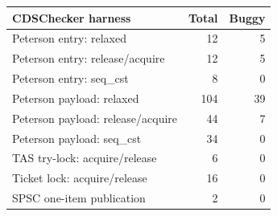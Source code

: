 \begin{tabular}{lrr}
\toprule CDSChecker harness & Total & Buggy \\
\midrule
Peterson entry: relaxed & 12 & 5 \\
Peterson entry: release/acquire & 12 & 5 \\
Peterson entry: seq\_cst & 8 & 0 \\
Peterson payload: relaxed & 104 & 39 \\
Peterson payload: release/acquire & 44 & 7 \\
Peterson payload: seq\_cst & 34 & 0 \\
TAS try-lock: acquire/release & 6 & 0 \\
Ticket lock: acquire/release & 16 & 0 \\
SPSC one-item publication & 2 & 0 \\
\bottomrule
\end{tabular}
